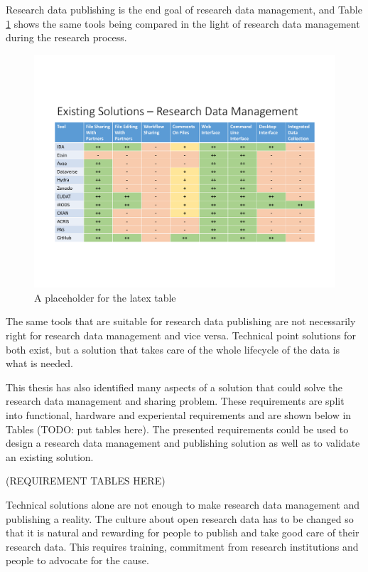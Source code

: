 Research data publishing is the end goal of research data management, and
Table \ref{fig:management} shows the same tools being compared in the light
of research data management during the research process.

\begin{figure}
    \begin{centering}
        \includegraphics[width=\textwidth]{images/management}
    \end{centering}
    \caption{A placeholder for the latex table}
    \label{fig:management}
\end{figure}

The same tools that are suitable for research data publishing are not
necessarily right for research data management and vice versa. Technical
point solutions for both exist, but a solution that takes care of the whole
lifecycle of the data is what is needed.

This thesis has also identified many aspects of a solution that could solve the
research data management and sharing problem. These requirements are split
into functional, hardware and experiental requirements and are shown below
in Tables (TODO: put tables here). The presented requirements could be used
to design a research data management and publishing solution as well as to
validate an existing solution.

(REQUIREMENT TABLES HERE)

Technical solutions alone are not enough to make research data management
and publishing a reality. The culture about open research data has to be
changed so that it is natural and rewarding for people to publish and take
good care of their research data. This requires training, commitment from
research institutions and people to advocate for the cause.
